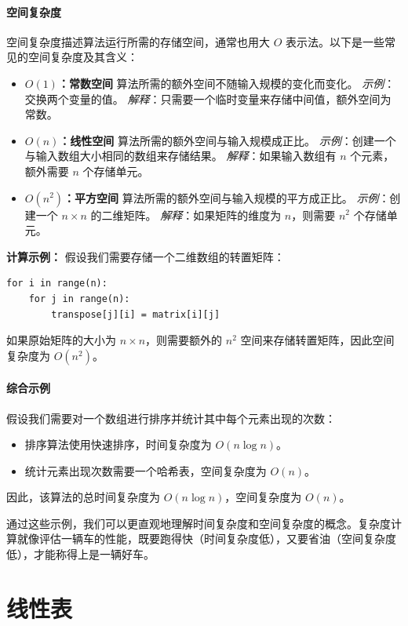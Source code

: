 \documentclass[lang=cn,newtx,10pt,scheme=chinese]{elegantbook}
\begin{document}
\subsubsection{空间复杂度}
空间复杂度描述算法运行所需的存储空间，通常也用大 $O$ 表示法。以下是一些常见的空间复杂度及其含义：

\begin{itemize}
    \item \textbf{$O(1)$：常数空间}
    算法所需的额外空间不随输入规模的变化而变化。
    \textit{示例}：交换两个变量的值。
    \textit{解释}：只需要一个临时变量来存储中间值，额外空间为常数。

    \item \textbf{$O(n)$：线性空间}
    算法所需的额外空间与输入规模成正比。
    \textit{示例}：创建一个与输入数组大小相同的数组来存储结果。
    \textit{解释}：如果输入数组有 $n$ 个元素，额外需要 $n$ 个存储单元。

    \item \textbf{$O(n^2)$：平方空间}
    算法所需的额外空间与输入规模的平方成正比。
    \textit{示例}：创建一个 $n \times n$ 的二维矩阵。
    \textit{解释}：如果矩阵的维度为 $n$，则需要 $n^2$ 个存储单元。
\end{itemize}

\textbf{计算示例：}
假设我们需要存储一个二维数组的转置矩阵：
\begin{verbatim}
for i in range(n):
    for j in range(n):
        transpose[j][i] = matrix[i][j]
\end{verbatim}
如果原始矩阵的大小为 $n \times n$，则需要额外的 $n^2$ 空间来存储转置矩阵，因此空间复杂度为 $O(n^2)$。

\subsubsection{综合示例}
假设我们需要对一个数组进行排序并统计其中每个元素出现的次数：
\begin{itemize}
    \item 排序算法使用快速排序，时间复杂度为 $O(n \log n)$。
    \item 统计元素出现次数需要一个哈希表，空间复杂度为 $O(n)$。
\end{itemize}
因此，该算法的总时间复杂度为 $O(n \log n)$，空间复杂度为 $O(n)$。

通过这些示例，我们可以更直观地理解时间复杂度和空间复杂度的概念。复杂度计算就像评估一辆车的性能，既要跑得快（时间复杂度低），又要省油（空间复杂度低），才能称得上是一辆好车。

\chapter{线性表}
\end{document}
